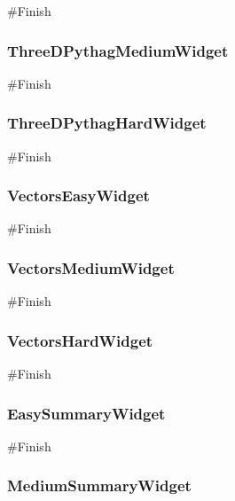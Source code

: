 \begin{landscape}
\begin{python}
#Finish
\end{python}

\subsubsection{ThreeDPythagMediumWidget}

\begin{python}
#Finish
\end{python}

\subsubsection{ThreeDPythagHardWidget}

\begin{python}
#Finish
\end{python}

\subsubsection{VectorsEasyWidget}

\begin{python}
#Finish
\end{python}

\subsubsection{VectorsMediumWidget}

\begin{python}
#Finish
\end{python}

\subsubsection{VectorsHardWidget}

\begin{python}
#Finish
\end{python}

\subsubsection{EasySummaryWidget}

\begin{python}
#Finish
\end{python}

\subsubsection{MediumSummaryWidget}


\end{landscape}
